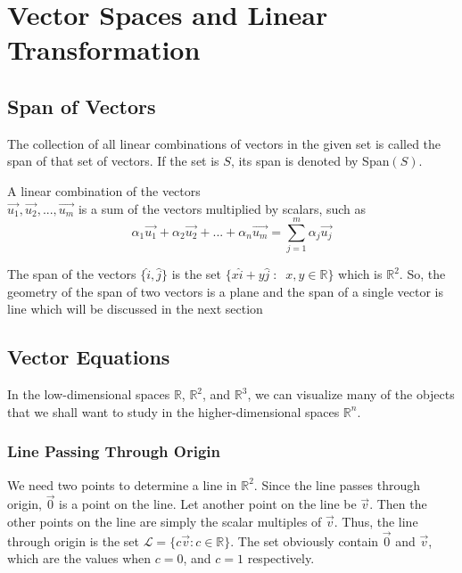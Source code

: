 \documentclass[math101_lecturenotes_ku.tex]{subfiles}
\begin{document}
\chapter{Vector Spaces and Linear Transformation}
\section{Span of Vectors}
The collection of all linear combinations of vectors in the given set is called the span of that set of vectors. If the set is $S$, its span is denoted by Span$(S)$.

\begin{definition}
A linear combination of the vectors \\ $\vec{u_1}, \vec{u_2}, ... , \vec{u_m}$
  is a sum of the vectors multiplied by scalars, such as $${\alpha}_1\vec{u_1} + \alpha_2\vec{u_2}+...+\alpha_n\vec{u_m}= \sum_{j=1}^m \alpha_j \vec{u_j}$$
\end{definition}

\begin{remark}
    The span of the vectors $\{\hat{i}, \hat{j}\}$ is the set $\{x\hat{i}+y\hat{j}\; : \;\; x,y \in \mathbb{R}\}$ which is $\mathbb{R}^2$. So, the geometry of the span of two vectors is a plane and the span of a single vector is line which will be discussed in the next section
\end{remark}

\section{Vector Equations}
In the low-dimensional spaces $\mathbb R$, ${\mathbb R}^2$, and ${\mathbb R}^3$, we can visualize many of the objects that we shall want to study in the higher-dimensional spaces ${\mathbb R}^n$.

\subsection{Line Passing Through Origin}
We need two points to determine a line in ${\mathbb R}^2$. Since the line passes through origin, $\Vec{0}$ is a point on the line. Let another point on the line be $\Vec{v}$. Then the other points on the line are simply the scalar multiples of $\Vec{v}$. Thus, the line through origin is the set $\mathcal{L}=\{c\vec{v}:c \in {\mathbb R}\}$. The set obviously contain $\vec{0}$ and $\vec{v}$, which are the values when $c=0$, and $c=1$ respectively.
\end{document}
